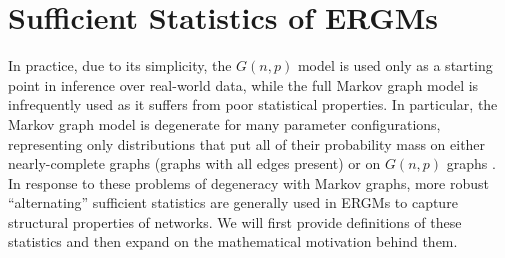 
\section{Sufficient Statistics of ERGMs}\label{sec:alt_stats}

In practice, due to its simplicity, the $G(n,p)$ model is used only as a starting point in inference over real-world data, while the full Markov graph model is infrequently used as it suffers from poor statistical properties. In particular, the Markov graph model is degenerate for many parameter configurations, representing only distributions that put all of their probability mass on either nearly-complete graphs (graphs with all edges present) or on $G(n,p)$ graphs \cite{Jon99}. In response to these problems of degeneracy with Markov graphs, more robust ``alternating'' sufficient statistics are generally used in ERGMs to capture structural properties of networks.  We will first provide definitions of these statistics and then expand on the mathematical motivation behind them.

